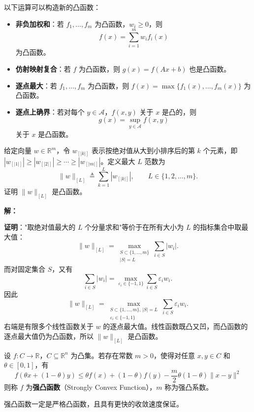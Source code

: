 \begin{conceptbox}[保持凸性的运算]
以下运算可以构造新的凸函数：
\begin{itemize}[itemsep=0.3em]
    \item \textbf{非负加权和}：若 $f_1, \ldots, f_m$ 为凸函数，$w_i \geq 0$，则
    \[
    f(x) = \sum_{i=1}^{m} w_i f_i(x)
    \]
    为凸函数。
    \item \textbf{仿射映射复合}：若 $f$ 为凸函数，则 $g(x) = f(Ax + b)$ 也是凸函数。
    \item \textbf{逐点最大}：若 $f_1, \ldots, f_m$ 为凸函数，则 $f(x) = \max\{f_1(x), \ldots, f_m(x)\}$ 为凸函数。
    \item \textbf{逐点上确界}：若对每个 $y \in \mathcal{A}$，$f(x, y)$ 关于 $x$ 是凸的，则
    \[
    g(x) = \sup_{y \in \mathcal{A}} f(x, y)
    \]
    关于 $x$ 是凸函数。
\end{itemize}
\end{conceptbox}

\begin{example}[最大$L$范数的凸性]\label{ex:max-L-norm}
给定向量 $w \in \mathbb{R}^m$，令 $w_{[|k|]}$ 表示按绝对值从大到小排序后的第 $k$ 个元素，即 $|w_{[|1|]}| \geq |w_{[|2|]}| \geq \cdots \geq |w_{[|m|]}|$。定义最大 $L$ 范数为
\[
\|w\|_{[L]} \triangleq \sum_{k=1}^{L} |w_{[|k|]}|,\qquad L \in \{1,2,\ldots,m\}.
\]
证明 $\|w\|_{[L]}$ 是凸函数。

\textbf{解：}

\textbf{证明}："取绝对值最大的 $L$ 个分量求和"等价于在所有大小为 $L$ 的指标集合中取最大值：
\[
\|w\|_{[L]} = \max_{\substack{S \subset \{1,\ldots,m\} \\ |S|=L}} \sum_{i \in S} |w_i|.
\]
而对固定集合 $S$，又有
\[
\sum_{i \in S} |w_i| = \max_{\varepsilon_i \in \{-1,1\}} \sum_{i \in S} \varepsilon_i w_i.
\]
因此
\[
\|w\|_{[L]} = \max_{\substack{S \subset \{1,\ldots,m\},\, |S|=L \\ \varepsilon_i \in \{-1,1\}}} \sum_{i \in S} \varepsilon_i w_i.
\]
右端是有限多个线性函数关于 $w$ 的逐点最大值。线性函数既凸又凹，而凸函数的逐点最大值仍为凸函数，所以 $\|w\|_{[L]}$ 是凸函数。
\end{example}

\begin{definition}[强凸函数]
设 $f: C \to \mathbb{R}$，$C \subseteq \mathbb{R}^n$ 为凸集。若存在常数 $m > 0$，使得对任意 $x, y \in C$ 和 $\theta \in [0,1]$，有
\[
f(\theta x + (1-\theta) y) \leq \theta f(x) + (1-\theta) f(y) - \frac{m}{2}\theta(1-\theta)\|x - y\|^2
\]
则称 $f$ 为\textbf{强凸函数}（Strongly Convex Function），$m$ 称为强凸系数。

强凸函数一定是严格凸函数，且具有更快的收敛速度保证。
\end{definition}

